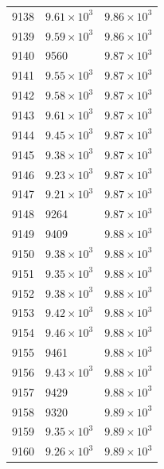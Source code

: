 \begin{table}[H]
\begin{tabular}{lll}
9138 & $\displaystyle 9.61 \times 10^{3}$ & $\displaystyle 9.86 \times 10^{3}$ \\
9139 & $\displaystyle 9.59 \times 10^{3}$ & $\displaystyle 9.86 \times 10^{3}$ \\
9140 & 9560 & $\displaystyle 9.87 \times 10^{3}$ \\
9141 & $\displaystyle 9.55 \times 10^{3}$ & $\displaystyle 9.87 \times 10^{3}$ \\
9142 & $\displaystyle 9.58 \times 10^{3}$ & $\displaystyle 9.87 \times 10^{3}$ \\
9143 & $\displaystyle 9.61 \times 10^{3}$ & $\displaystyle 9.87 \times 10^{3}$ \\
9144 & $\displaystyle 9.45 \times 10^{3}$ & $\displaystyle 9.87 \times 10^{3}$ \\
9145 & $\displaystyle 9.38 \times 10^{3}$ & $\displaystyle 9.87 \times 10^{3}$ \\
9146 & $\displaystyle 9.23 \times 10^{3}$ & $\displaystyle 9.87 \times 10^{3}$ \\
9147 & $\displaystyle 9.21 \times 10^{3}$ & $\displaystyle 9.87 \times 10^{3}$ \\
9148 & 9264 & $\displaystyle 9.87 \times 10^{3}$ \\
9149 & 9409 & $\displaystyle 9.88 \times 10^{3}$ \\
9150 & $\displaystyle 9.38 \times 10^{3}$ & $\displaystyle 9.88 \times 10^{3}$ \\
9151 & $\displaystyle 9.35 \times 10^{3}$ & $\displaystyle 9.88 \times 10^{3}$ \\
9152 & $\displaystyle 9.38 \times 10^{3}$ & $\displaystyle 9.88 \times 10^{3}$ \\
9153 & $\displaystyle 9.42 \times 10^{3}$ & $\displaystyle 9.88 \times 10^{3}$ \\
9154 & $\displaystyle 9.46 \times 10^{3}$ & $\displaystyle 9.88 \times 10^{3}$ \\
9155 & 9461 & $\displaystyle 9.88 \times 10^{3}$ \\
9156 & $\displaystyle 9.43 \times 10^{3}$ & $\displaystyle 9.88 \times 10^{3}$ \\
9157 & 9429 & $\displaystyle 9.88 \times 10^{3}$ \\
9158 & 9320 & $\displaystyle 9.89 \times 10^{3}$ \\
9159 & $\displaystyle 9.35 \times 10^{3}$ & $\displaystyle 9.89 \times 10^{3}$ \\
9160 & $\displaystyle 9.26 \times 10^{3}$ & $\displaystyle 9.89 \times 10^{3}$ \\

\end{tabular}
\end{table}

